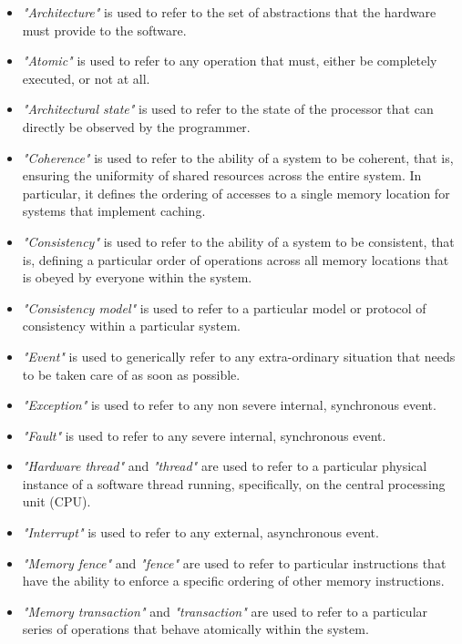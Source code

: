 \documentclass{article}
\begin{document}
        \begin{itemize}

            \item \textit{"Architecture"} is used to refer to the set of abstractions that the hardware must provide to the software.
            \item \textit{"Atomic"} is used to refer to any operation that must, either be completely executed, or not at all.
            \item \textit{"Architectural state"} is used to refer to the state of the processor that can directly be observed by the programmer.
            \item \textit{"Coherence"} is used to refer to the ability of a system to be coherent, that is, ensuring the uniformity of shared resources across the entire system. In particular, it defines the ordering of accesses to a single memory location for systems that implement caching.
            \item \textit{"Consistency"} is used to refer to the ability of a system to be consistent, that is, defining a particular order of operations across all memory locations that is obeyed by everyone within the system.
            \item \textit{"Consistency model"} is used to refer to a particular model or protocol of consistency within a particular system.
            \item \textit{"Event"} is used to generically refer to any extra-ordinary situation that needs to be taken care of as soon as possible.
            \item \textit{"Exception"} is used to refer to any non severe internal, synchronous event.
            \item \textit{"Fault"} is used to refer to any severe internal, synchronous event.
            \item \textit{"Hardware thread"} and \textit{"thread"} are used to refer to a particular physical instance of a software thread running, specifically, on the central processing unit (CPU).
            \item \textit{"Interrupt"} is used to refer to any external, asynchronous event.
            \item \textit{"Memory fence"} and \textit{"fence"} are used to refer to particular instructions that have the ability to enforce a specific ordering of other memory instructions.
            \item \textit{"Memory transaction"} and \textit{"transaction"} are used to refer to a particular series of operations that behave atomically within the system.

\end{itemize}
\end{document}
